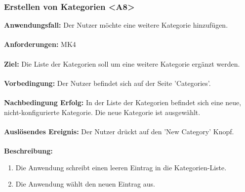\documentclass[parskip=full]{scrartcl} %
\begin{document}
\subsubsection*{Erstellen von Kategorien <A8>}
\textbf{Anwendungsfall:} Der Nutzer möchte eine weitere Kategorie hinzufügen.\\\\
\textbf{Anforderungen:} MK4\\\\
\textbf{Ziel:} Die Liste der Kategorien soll um eine weitere Kategorie ergänzt werden. \\\\
\textbf{Vorbedingung:} Der Nutzer befindet sich auf der Seite 'Categories'. \\\\
\textbf{Nachbedingung Erfolg:} In der Liste der Kategorien befindet sich eine neue, nicht-konfigurierte Kategorie. Die neue Kategorie ist ausgewählt.\\\\
\textbf{Auslösendes Ereignis:} Der Nutzer drückt auf den 'New Category' Knopf. \\\\
\textbf{Beschreibung:}
\begin{enumerate}
    \item Die Anwendung schreibt einen leeren Eintrag in die Kategorien-Liste.
    \item Die Anwendung wählt den neuen Eintrag aus.
\end{enumerate}
\newpage
\end{document}

